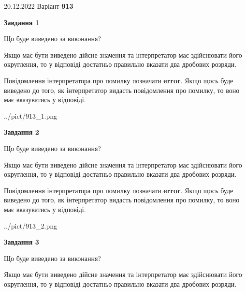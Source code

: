 \documentclass[12pt, ukrainian]{article}
\begin{document}
{20.12.2022 Варіант \No \textbf { 913 }\par}
{
\begin {Large}

{\begin {center}\textbf{Завдання 1}\end {center}}\par
Що буде виведено за виконання? \par

Якщо має бути виведено дійсне значення та інтерпретатор має здійснювати його округлення, 
то у відповіді достатньо правильно вказати два дробових розряди.

Повідомлення інтерпретатора про помилку позначати \textbf{error}.
Якщо щось буде виведено до того, як інтерпретатор видасть повідомлення про помилку, 
то воно має вказуватись у відповіді. \par

\begin{center}
	{../pict/913_1.png}
\end{center}
\newpage

{\begin {center}\textbf{Завдання 2}\end {center}}\par
Що буде виведено за виконання? \par

Якщо має бути виведено дійсне значення та інтерпретатор має здійснювати його округлення, 
то у відповіді достатньо правильно вказати два дробових розряди.

Повідомлення інтерпретатора про помилку позначати \textbf{error}.
Якщо щось буде виведено до того, як інтерпретатор видасть повідомлення про помилку, 
то воно має вказуватись у відповіді. \par

\begin{center}
	{../pict/913_2.png}
\end{center}
\newpage

{\begin {center}\textbf{Завдання 3}\end {center}}\par
Що буде виведено за виконання? \par

Якщо має бути виведено дійсне значення та інтерпретатор має здійснювати його округлення, 
то у відповіді достатньо правильно вказати два дробових розряди.


\end{Large}}
\end{document}
